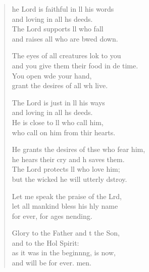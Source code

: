\begin{verse}
  \begin{patverse}
he Lord is faithful in ll his words\Med\\
and loving in all h\pointup{\i}s deeds.\\
The Lord supports ll who fall\Med\\
and raises all who are bwed down.

The eyes of all creatures lok to you\Med\\
and you give them their food in de time.\\
You open w\pointup{\i}de your hand,\Med\\
grant the desires of all wh live.

The Lord is just in ll his ways\Med\\
and loving in all h\pointup{\i}s deeds.\\
He is close to ll who call him,\Med\\
who call on him from thir hearts.

He grants the desires of thse who fear him,\Med\\
he hears their cry and h saves them.\\
The Lord protects ll who love him;\Med\\
but the wicked he will utterly dstroy.

Let me speak the praise of the Lrd,\Flex\\
let all mankind bless his hly name\Med\\
for ever, for ages nending.

Glory to the Father and t the Son,\Med\\
and to the Hol Spirit:\\
as it was in the beginn\pointup{\i}ng, is now,\Med\\
and will be for ever. men.
  \end{patverse}
\end{verse}
